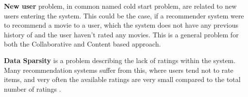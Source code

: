 \textbf{New user} problem, in common named cold start problem, are related to new users entering the system. This could be the case, if a recommender system were to recommend a movie to a user, which the system does not have any previous history of and the user haven't rated any movies. This is a general problem for both the Collaborative and Content based approach. \newline

\textbf{Data Sparsity} is a problem describing the lack of ratings within the system. Many recommendation systems suffer from this, where users tend not to rate items, and very often the available ratings are very small compared to the total number of ratings \citep[p. 19]{TowardsTheNextGenerationOfRs}. 

\newpage